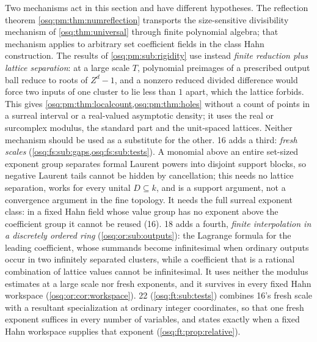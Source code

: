 \documentclass[11pt,letterpaper]{article}
\numberwithin{equation}{section}
\theoremstyle{definition}
\theoremstyle{remark}
\theoremstyle{plain}
\begin{document}
Two mechanisms act in this section and have different hypotheses. The reflection theorem
\cref{osq:pm:thm:numreflection} transports the size-sensitive divisibility mechanism of
\cref{osq:thm:universal} through finite polynomial algebra; that mechanism applies to
arbitrary set coefficient fields in the class Hahn construction. The results of
\cref{osq:pm:sub:rigidity} use instead \emph{finite reduction plus lattice separation}: at
a large scale $T$, polynomial preimages of a prescribed output ball reduce to roots of
$Z^d-1$, and a nonzero reduced divided difference would force two inputs of one cluster to
lie less than $1$ apart, which the lattice forbids. This gives
\cref{osq:pm:thm:localcount,osq:pm:thm:holes} without a count of points in a surreal
interval or a real-valued asymptotic density; it uses the real or surcomplex modulus, the
standard part and the unit-spaced lattices. Neither mechanism should be used as a
substitute for the other. 16 adds a third: \emph{fresh scales} (\cref{osq:fs:sub:gaps,osq:fs:sub:tests}). A
monomial above an entire set-sized exponent group separates formal Laurent powers into disjoint support
blocks, so negative Laurent tails cannot be hidden by cancellation; this needs no lattice separation, works for
every unital $D\subseteq k$, and is a support argument, not a convergence argument in the fine topology. It needs the
full surreal exponent class: in a fixed Hahn field whose value group has no exponent above the coefficient group
it cannot be reused (16). 18 adds a fourth, \emph{finite interpolation in a discretely ordered ring}
(\cref{osq:or:sub:outputs}): the Lagrange formula for the leading coefficient, whose summands become infinitesimal when
ordinary outputs occur in two infinitely separated clusters, while a coefficient that is a rational combination of
lattice values cannot be infinitesimal. It uses neither the modulus estimates at a large scale nor fresh exponents, and
it survives in every fixed Hahn workspace (\cref{osq:or:cor:workspace}). 22 (\cref{osq:ft:sub:tests}) combines 16's fresh scale with a
resultant specialization at ordinary integer coordinates, so that one fresh exponent suffices in every number of variables, and states exactly when a
fixed Hahn workspace supplies that exponent (\cref{osq:ft:prop:relative}).
\end{document}
